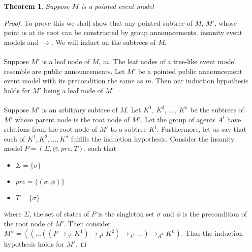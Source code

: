 \documentclass[12pt, a4paper, titlepage]{scrartcl}
\newtheorem{thm}{Theorem}
\begin{document}
\begin{thm}
Suppose $M$ is a pointed event model
\end{thm}
\begin{proof}
To prove this we shall show that any pointed subtree of $M$, $M'$, whose point
is at its root can be constructed by group announcements, insanity event models
and $\to$.
We will induct on the subtrees of $M$.\\
\\
Suppose $M'$ is a leaf node of $M$, $m$.
The leaf nodes of a tree-like event model resemble are public announcements.
Let $M'$ be a pointed public announcement event model with its precondition the
same as $m$.
Then our induction hypothesis holds for $M'$ being a leaf node of $M$.\\
\\
Suppose $M'$ is an arbitrary subtree of $M$.
Let $K^1$, $K^2$, $\ldots$, $K^n$ be the subtrees of $M'$ whose parent node is
the root node of $M'$.
Let the group of agents $A^i$ have relations from the root node of $M'$ to a
subtree $K^i$.
Furthermore, let us say that each of $K^1, K^2, \ldots, K^n$ fulfills the
induction hypothesis.
Consider the insanity model $P = (\Sigma,\varnothing,pre,T)$, such that
\begin{itemize}
  \item $\Sigma = \{ \sigma \}$
  \item $pre = \{ (\sigma, \phi)\}$
  \item $T = \{\sigma\}$
\end{itemize}
where $\Sigma$, the set of states of $P$ is the singleton set $\sigma$ and 
$\phi$ is the precondition of the root node of $M'$.
Then consider $M'' = ((\ldots((P \to_{A^1} K^1) \to_{A^2} K^2) \to_{A^3} \ldots)\to_{A^n} K^n)$.
Thus the induction hypothesis holds for $M'$.
\end{proof}
\end{document}
